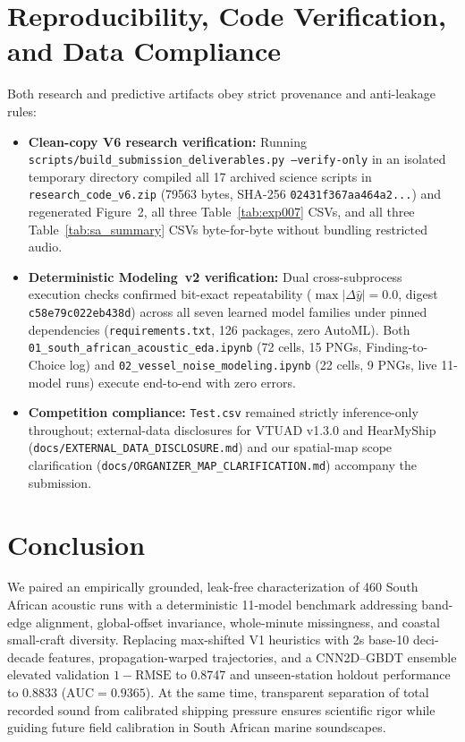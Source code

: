 \documentclass[10pt,a4paper]{article}
\begin{document}
\section{Reproducibility, Code Verification, and Data Compliance}
Both research and predictive artifacts obey strict provenance and anti-leakage rules:
\begin{itemize}
    \item \textbf{Clean-copy V6 research verification:} Running \texttt{scripts/build\_submission\_deliverables.py --verify-only} in an isolated temporary directory compiled all 17 archived science scripts in \texttt{research\_code\_v6.zip} (79563 bytes, SHA-256 \texttt{02431f367aa464a2...}) and regenerated Figure~2, all three Table~\ref{tab:exp007} CSVs, and all three Table~\ref{tab:sa_summary} CSVs byte-for-byte without bundling restricted audio.
    \item \textbf{Deterministic Modeling~v2 verification:} Dual cross-subprocess execution checks confirmed bit-exact repeatability ($\max|\Delta \hat{y}| = 0.0$, digest \texttt{c58e79c022eb438d}) across all seven learned model families under pinned dependencies (\texttt{requirements.txt}, 126 packages, zero AutoML). Both \texttt{01\_south\_african\_acoustic\_eda.ipynb} (72 cells, 15 PNGs, Finding-to-Choice log) and \texttt{02\_vessel\_noise\_modeling.ipynb} (22 cells, 9 PNGs, live 11-model runs) execute end-to-end with zero errors.
    \item \textbf{Competition compliance:} \texttt{Test.csv} remained strictly inference-only throughout; external-data disclosures for VTUAD v1.3.0 and HearMyShip (\texttt{docs/EXTERNAL\_DATA\_DISCLOSURE.md}) and our spatial-map scope clarification (\texttt{docs/ORGANIZER\_MAP\_CLARIFICATION.md}) accompany the submission.
\end{itemize}

\section{Conclusion}
We paired an empirically grounded, leak-free characterization of 460 South African acoustic runs with a deterministic 11-model benchmark addressing band-edge alignment, global-offset invariance, whole-minute missingness, and coastal small-craft diversity. Replacing max-shifted V1 heuristics with 2s base-10 deci-decade features, propagation-warped trajectories, and a CNN2D--GBDT ensemble elevated validation $1-\mathrm{RMSE}$ to 0.8747 and unseen-station holdout performance to 0.8833 ($\mathrm{AUC} = 0.9365$). At the same time, transparent separation of total recorded sound from calibrated shipping pressure ensures scientific rigor while guiding future field calibration in South African marine soundscapes.

\printbibliography[heading=bibintoc,title={References}]
\end{document}
